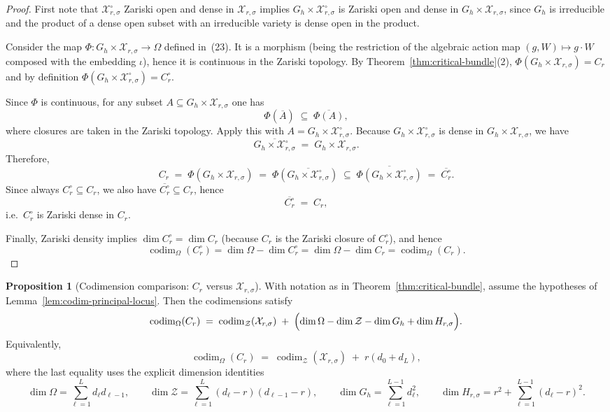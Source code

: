 \documentclass{article}
\newcommand{\codim}{\operatorname{codim}}
\theoremstyle{definition}
\newtheorem{proposition}[theorem]{Proposition}
\begin{document}
\begin{proof}
First note that $\mathcal X_{r,\sigma}^{\circ}$ Zariski open and dense in $\mathcal X_{r,\sigma}$ implies
$G_h\times \mathcal X_{r,\sigma}^{\circ}$ is Zariski open and dense in $G_h\times \mathcal X_{r,\sigma}$, since $G_h$ is irreducible and
the product of a dense open subset with an irreducible variety is dense open in the product.

Consider the map $\Phi\colon G_h\times \mathcal X_{r,\sigma}\to \Omega$ defined in~\textup{(23)}. It is a morphism (being the restriction of the
algebraic action map $(g,W)\mapsto g\cdot W$ composed with the embedding $\iota$), hence it is continuous in the Zariski topology.
By Theorem~\ref{thm:critical-bundle}\textup{(2)}, $\Phi(G_h\times \mathcal X_{r,\sigma})=C_r$ and by definition
$\Phi(G_h\times \mathcal X_{r,\sigma}^{\circ})=C_r^{\circ}$.

Since $\Phi$ is continuous, for any subset $A\subseteq G_h\times \mathcal X_{r,\sigma}$ one has
\[
\Phi(\overline{A}) \;\subseteq\; \overline{\Phi(A)},
\]
where closures are taken in the Zariski topology. Apply this with $A=G_h\times \mathcal X_{r,\sigma}^{\circ}$.
Because $G_h\times \mathcal X_{r,\sigma}^{\circ}$ is dense in $G_h\times \mathcal X_{r,\sigma}$, we have
\[
\overline{G_h\times \mathcal X_{r,\sigma}^{\circ}} \;=\; G_h\times \mathcal X_{r,\sigma}.
\]
Therefore,
\[
C_r \;=\; \Phi(G_h\times \mathcal X_{r,\sigma})
\;=\; \Phi\!\left(\overline{G_h\times \mathcal X_{r,\sigma}^{\circ}}\right)
\;\subseteq\; \overline{\Phi(G_h\times \mathcal X_{r,\sigma}^{\circ})}
\;=\; \overline{C_r^{\circ}}.
\]
Since always $C_r^{\circ}\subseteq C_r$, we also have $\overline{C_r^{\circ}}\subseteq C_r$, hence
\[
\overline{C_r^{\circ}} \;=\; C_r,
\]
i.e.\ $C_r^{\circ}$ is Zariski dense in $C_r$.

Finally, Zariski density implies $\dim C_r^{\circ}=\dim C_r$ (because $C_r$ is the Zariski closure of $C_r^{\circ}$), and hence
\[
\codim_{\Omega}(C_r^{\circ})
= \dim\Omega - \dim C_r^{\circ}
= \dim\Omega - \dim C_r
= \codim_{\Omega}(C_r).
\]
\end{proof}
\begin{proposition}[Codimension comparison: $C_r$ versus $\mathcal X_{r,\sigma}$]
\label{prop:codim-Cr-vs-Xrsigma}
With notation as in Theorem~\ref{thm:critical-bundle}, assume the hypotheses of Lemma~\ref{lem:codim-principal-locus}.
Then the codimensions satisfy
\begin{equation}\label{eq:codim-Cr-vs-Xrsigma}
\codim_{\Omega}(C_r)
\;=\;
\codim_{\mathcal Z}(\mathcal X_{r,\sigma})
\;+\;
\Bigl(\dim\Omega-\dim\mathcal Z-\dim G_h+\dim H_{r,\sigma}\Bigr).
\end{equation}
Equivalently,
\[
\codim_{\Omega}(C_r)
\;=\;
\codim_{\mathcal Z}(\mathcal X_{r,\sigma})
\;+\;
r(d_0+d_L),
\]
where the last equality uses the explicit dimension identities
\[
\dim\Omega=\sum_{\ell=1}^L d_\ell d_{\ell-1},\qquad
\dim\mathcal Z=\sum_{\ell=1}^L (d_\ell-r)(d_{\ell-1}-r),\qquad
\dim G_h=\sum_{\ell=1}^{L-1} d_\ell^2,\qquad
\dim H_{r,\sigma}=r^2+\sum_{\ell=1}^{L-1}(d_\ell-r)^2.
\]
\end{proposition}
\end{document}
